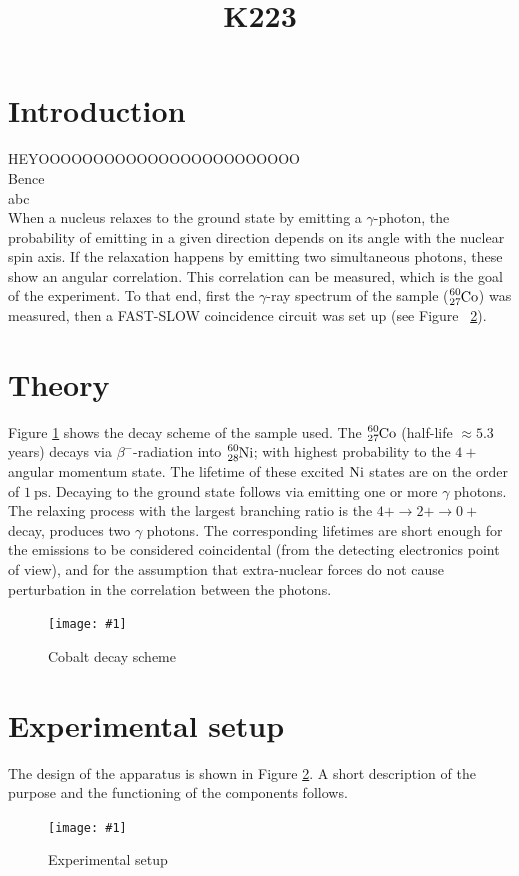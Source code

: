 \documentclass[twocolumn]{article}
\title{K223}
\newcommand{\insertFigure}[1]{%
   \texttt{[image: \#1]}%
}
\begin{document}
\maketitle
\newpage
\section{Introduction}
HEYOOOOOOOOOOOOOOOOOOOOOOOO\\
Bence\\
abc\\
When a nucleus relaxes to the ground state by emitting a $\gamma$-photon, the probability of emitting in a given direction depends on its angle with the nuclear spin axis. If the relaxation happens by emitting two simultaneous photons, these show an angular correlation. This correlation can be measured, which is the goal of the experiment. To that end, first the $\gamma$-ray spectrum of the sample ($\ce{_27^{60}Co}$) was measured, then a FAST-SLOW coincidence circuit was set up (see Figure ~\ref{fig:exp_setup}). 
\section{Theory}
Figure \ref{fig:cobalt_scheme} shows the decay scheme of the sample used. The $\ce{_27^{60}Co}$ (half-life $\approx 5.3$ years) decays via $\beta^-$-radiation into $\ce{_28^{60}Ni}$; with highest probability to the $4+$ angular momentum state. %
The lifetime of these excited $\ce{Ni}$ states are on the order of $\SI{1}{\pico\second}$. 
Decaying to the ground state follows via emitting one or more $\gamma$ photons. The relaxing process with the largest branching ratio is the $4+ \rightarrow 2+ \rightarrow 0+$ decay, produces two $\gamma$ photons. The corresponding lifetimes are short enough for the emissions to be considered coincidental (from the detecting electronics point of view), and for the assumption that extra-nuclear forces do not cause perturbation in the correlation between the photons.
\begin{figure}[!h]
\centering
\insertFigure{cobalt_scheme.png}
\caption{Cobalt decay scheme \cite{cobalt_scheme}}
\label{fig:cobalt_scheme}
\end{figure}
\section{Experimental setup}
The design of the apparatus is shown in Figure \ref{fig:exp_setup}. A short description of the purpose and the functioning of the components follows.
\begin{figure}[!h]
\centering
\insertFigure{k223_setup.png}
\caption{Experimental setup \cite{booklet}}
\label{fig:exp_setup}
\end{figure}
\end{document}
